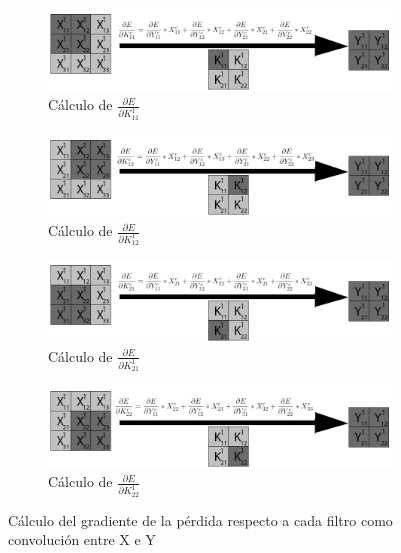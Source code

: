 \begin{figure}[H]
	\centering
	\begin{subfigure}{.5\textwidth}
		\hspace{-25mm}
		\includegraphics[width=1.4\linewidth]{imagenes/conv_backprop_1.jpg}  
		\caption{Cálculo de $\frac{\partial E}{\partial K^1_{11}}$}
	\end{subfigure}%
	\begin{subfigure}{.5\textwidth}
		\hspace{5mm}
		\includegraphics[width=1.4\linewidth]{imagenes/conv_backprop_2.jpg}  
		\caption{Cálculo de $\frac{\partial E}{\partial K^1_{12}}$}
	\end{subfigure}
	\vspace{5mm}
	\begin{subfigure}{.5\textwidth}
	\hspace{-25mm}
	\includegraphics[width=1.4\linewidth]{imagenes/conv_backprop_3.jpg}  
	\caption{Cálculo de $\frac{\partial E}{\partial K^1_{21}}$}
	\end{subfigure}%
	\begin{subfigure}{.5\textwidth}
	\hspace{5mm}
	\includegraphics[width=1.4\linewidth]{imagenes/conv_backprop_4.jpg}  
	\caption{Cálculo de $\frac{\partial E}{\partial K^1_{22}}$}
	\end{subfigure}
	\caption{Cálculo del gradiente de la pérdida respecto a cada filtro como convolución entre X e Y}
	\label{fig:conv_backprop_como_convolucion_X_Y}
\end{figure}

